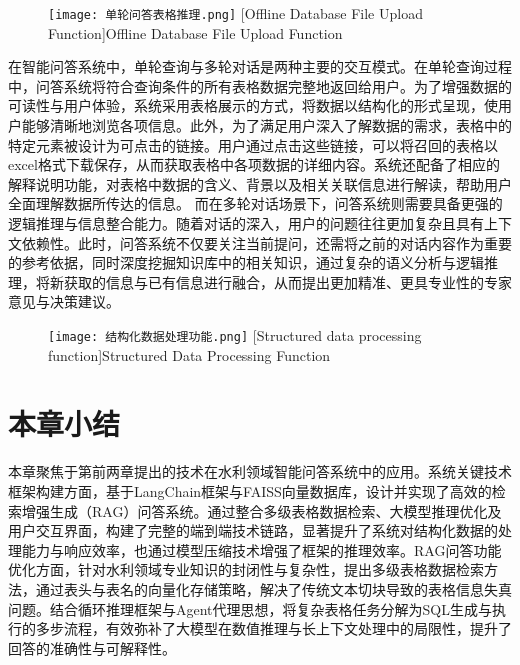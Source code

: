 \begin{figure}[htb]
    \centering
    \texttt{[image: 单轮问答表格推理.png]}
    [Offline Database File Upload Function]{Offline Database File Upload Function}
    \label{fig:单轮问答}
\end{figure}
在智能问答系统中，单轮查询与多轮对话是两种主要的交互模式。在单轮查询过程中，问答系统将符合查询条件的所有表格数据完整地返回给用户。为了增强数据的可读性与用户体验，系统采用表格展示的方式，将数据以结构化的形式呈现，使用户能够清晰地浏览各项信息。此外，为了满足用户深入了解数据的需求，表格中的特定元素被设计为可点击的链接。用户通过点击这些链接，可以将召回的表格以excel格式下载保存，从而获取表格中各项数据的详细内容。系统还配备了相应的解释说明功能，对表格中数据的含义、背景以及相关关联信息进行解读，帮助用户全面理解数据所传达的信息。
而在多轮对话场景下，问答系统则需要具备更强的逻辑推理与信息整合能力。随着对话的深入，用户的问题往往更加复杂且具有上下文依赖性。此时，问答系统不仅要关注当前提问，还需将之前的对话内容作为重要的参考依据，同时深度挖掘知识库中的相关知识，通过复杂的语义分析与逻辑推理，将新获取的信息与已有信息进行融合，从而提出更加精准、更具专业性的专家意见与决策建议。
\begin{figure}[ht]
    \centering
    \texttt{[image: 结构化数据处理功能.png]}
    [Structured data processing function]{Structured Data Processing Function}
    \label{fig:结构化数据}
\end{figure}


\section{本章小结}
本章聚焦于第前两章提出的技术在水利领域智能问答系统中的应用。系统关键技术框架构建方面，基于LangChain框架与FAISS向量数据库，设计并实现了高效的检索增强生成（RAG）问答系统。通过整合多级表格数据检索、大模型推理优化及用户交互界面，构建了完整的端到端技术链路，显著提升了系统对结构化数据的处理能力与响应效率，也通过模型压缩技术增强了框架的推理效率。RAG问答功能优化方面，针对水利领域专业知识的封闭性与复杂性，提出多级表格数据检索方法，通过表头与表名的向量化存储策略，解决了传统文本切块导致的表格信息失真问题。结合循环推理框架与Agent代理思想，将复杂表格任务分解为SQL生成与执行的多步流程，有效弥补了大模型在数值推理与长上下文处理中的局限性，提升了回答的准确性与可解释性。

